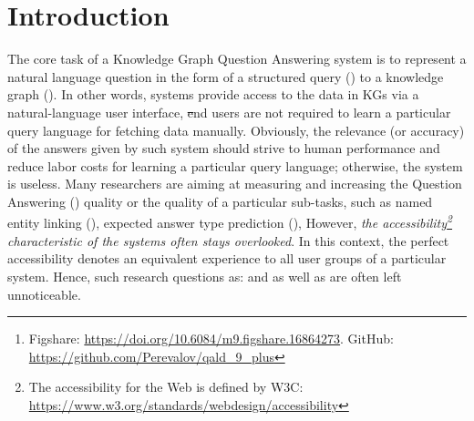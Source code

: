 \documentclass[conference]{IEEEtran}
\begin{document}
\begin{abstract}
The ability to have the same experience for different user groups (i.e., accessibility) is one of the most important characteristics of Web-based systems.
The same is true for Knowledge Graph Question Answering (KGQA) systems that provide the access to Semantic Web data via natural language interface.
While following our research agenda on the multilingual aspect of accessibility of KGQA systems, we identified several ongoing challenges.
One of them is the lack of multilingual KGQA benchmarks.
In this work, we extend one of the most popular KGQA benchmarks -- QALD-9 by introducing high-quality questions' translations to 8 languages provided by native speakers, and transferring the SPARQL queries of QALD-9 from DBpedia to Wikidata, s.t., the usability and relevance of the dataset is strongly increased.
Five of the languages -- Armenian, Ukrainian, Lithuanian, Bashkir and Belarusian -- to our best knowledge were never considered in KGQA research community before.
The latter two of the languages are considered as  by UNESCO.
We call the extended dataset QALD-9-plus and made it available online\footnote{Figshare: \url{https://doi.org/10.6084/m9.figshare.16864273}. GitHub: \url{https://github.com/Perevalov/qald\_9\_plus}}.
\end{abstract}






\IEEEpeerreviewmaketitle

\section{Introduction}

The core task of a Knowledge Graph Question Answering system is to represent a natural language question in the form of a structured query (\eg \SPARQL) to a knowledge graph (\KG).
In other words, \KGQA systems provide access to the data in KGs via a natural-language user interface, \st end users are not required to learn a particular query language for fetching data manually.
Obviously, the relevance (or accuracy) of the answers given by such system should strive to human performance and reduce labor costs for learning a particular query language; otherwise, the system is useless.
Many researchers are aiming at measuring and increasing the Question Answering (\QA) quality or the quality of a particular \KGQA sub-tasks, such as named entity linking (\eg \cite{DBLP:conf/icwe/DiefenbachSBC0A17}), expected answer type prediction (\eg \cite{smartPerevalov}), \etc
However, \emph{the accessibility\footnote{The accessibility for the Web is defined by W3C: \url{https://www.w3.org/standards/webdesign/accessibility}} characteristic of the \KGQA systems often stays overlooked}.
In this context, the perfect accessibility denotes an equivalent experience to all user groups of a particular \KGQA system.
Hence, such research questions as:  and  as well as  are often left unnoticeable.
\end{document}
